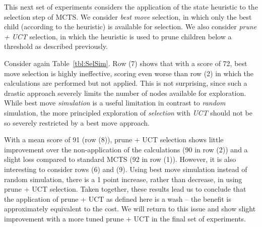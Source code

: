 \documentclass[letterpaper]{article}
\begin{document}
This next set of experiments considers the application of the state heuristic to the selection step of MCTS. We consider {\it best move} selection, in which only the best child (according to the heuristic) is available for selection. We also consider {\it prune + UCT} selection, in which the heuristic is used to prune children below a threshold as described previously.

Consider again Table~\ref{tbl:SelSim}. Row (7) shows that with a score of 72, best move selection is highly ineffective, scoring even worse than row (2) in which the calculations are performed but not applied. This is not surprising, since such a drastic approach severely limits the number of nodes available for exploration. While best move {\it simulation} is a useful limitation in contrast to {\it random} simulation, the more principled exploration of {\it selection} with {\it UCT} should not be so severely restricted by a best move approach.

With a mean score of 91 (row (8)), prune + UCT selection shows little improvement over the non-application of the calculations (90 in row (2)) and a slight loss compared to standard MCTS (92 in row (1)). However, it is also interesting to consider rows (6) and (9). Using best move simulation instead of random simulation, there is a 1 point increase, rather than decrease, in using prune + UCT selection. Taken together, these results lead us to conclude that the application of prune + UCT as defined here is a wash -- the benefit is approximately equivalent to the cost. We will return to this issue and show slight improvement with a more tuned prune + UCT in the final set of experiments.


\end{document}
